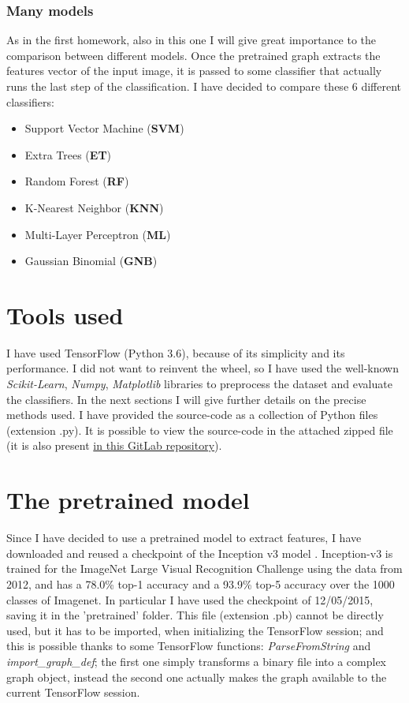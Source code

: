 \documentclass[12pt]{article}
\begin{document}
\subsubsection{Many models}
\label{sec:models}
As in the first homework, also in this one I will give great importance to the comparison \cite{Main Book} between different models. Once the pretrained graph extracts the features vector of the input image, it is passed to some classifier that actually runs the last step of the classification. I have decided to compare these 6 different classifiers:
\begin{itemize}
	\item Support Vector Machine (\textbf{SVM})
	\item Extra Trees (\textbf{ET})
	\item Random Forest (\textbf{RF})
	\item K-Nearest Neighbor (\textbf{KNN})
	\item Multi-Layer Perceptron (\textbf{ML})
	\item Gaussian Binomial (\textbf{GNB})
\end{itemize}

\section{Tools used}
I have used TensorFlow (Python 3.6), because of its simplicity and its performance. I did not want to reinvent the wheel, so I have used the well-known \textit{Scikit-Learn}, \textit{Numpy}, \textit{Matplotlib} libraries to preprocess the dataset and evaluate the classifiers. In the next sections I will give further details on the precise methods used.
I have provided the source-code as a collection of Python files (extension .py). It is possible to view the source-code in the attached zipped file (it is also present \href{https://www.gitlab.com/lrusso96/machine-learning}{in this GitLab repository}).

\section{The pretrained model}
Since I have decided to use a pretrained model to extract features, I have downloaded and reused a checkpoint of the Inception v3 model \cite{Inception}. Inception-v3 is trained for the ImageNet Large Visual Recognition Challenge using the data from 2012, and has a 78.0\% top-1 accuracy and a 93.9\% top-5 accuracy over the 1000 classes of Imagenet. In particular I have used the checkpoint of 12/05/2015, saving it in the 'pretrained' folder. This file (extension .pb) cannot be directly used, but it has to be imported, when initializing the TensorFlow session; and this is possible thanks to some TensorFlow functions: \textit{ParseFromString} and \textit{import\_graph\_def}; the first one simply transforms a binary file into a complex graph object, instead the second one actually makes the graph available to the current TensorFlow session.
\end{document}
